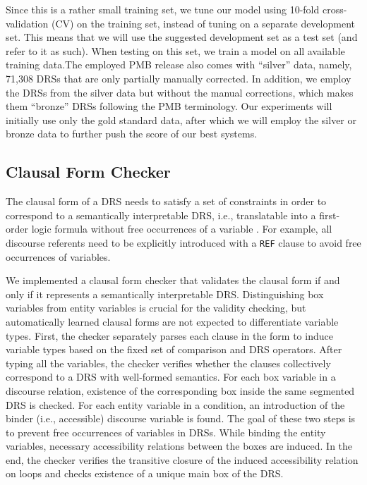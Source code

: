 \documentclass[11pt,a4paper]{article}
\begin{document}
Since this is a rather small training set, we tune our model using 10-fold cross-validation (CV) on the training set, instead of tuning on a separate development set. This means that we will use the suggested development set as a test set (and refer to it as such). When testing on this set, we train a model on all available training data.The employed PMB release also comes with ``silver'' data, namely, 71,308 DRSs that are only partially manually corrected. 
In addition, we employ the DRSs from the silver data but without the manual corrections, which makes them ``bronze'' DRSs following the PMB terminology. Our experiments will initially use only the gold standard data, after which we will employ the silver or bronze data to further push the score of our best systems.

\subsection{Clausal Form Checker}
\label{ssec:clf_checker}

The clausal form of a DRS needs to satisfy a set of constraints in order to correspond to a semantically interpretable DRS, i.e., translatable into a first-order logic formula without free occurrences of a variable \cite{kampreyle:drt}.
For example, all discourse referents need to be explicitly introduced with a \texttt{REF} clause to avoid free occurrences of variables.

We implemented a clausal form checker that validates the clausal form if and only if it represents a semantically interpretable DRS.
Distinguishing box variables from entity variables is crucial for the validity checking, but automatically learned clausal forms are not expected to differentiate variable types.
First, the checker separately parses each clause in the form to induce variable types based on the fixed set of comparison and DRS operators.
After typing all the variables, the checker verifies whether the clauses collectively correspond to a DRS with well-formed semantics. 
For each box variable in a discourse relation, existence of the corresponding box inside the same segmented DRS is checked.
For each entity variable in a condition, an introduction of the binder (i.e., accessible) discourse variable is found.
The goal of these two steps is to prevent free occurrences of variables in DRSs.   
While binding the entity variables, necessary accessibility relations between the boxes are induced.
In the end, the checker verifies the transitive closure of the induced accessibility relation on loops and checks existence of a unique main box of the DRS.  
\end{document}
